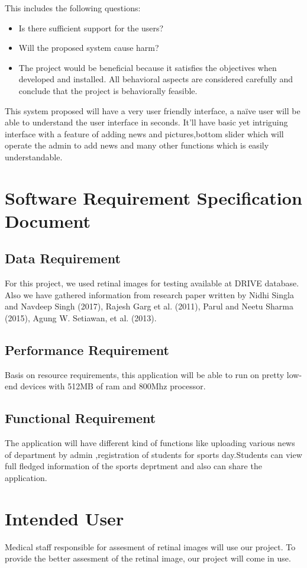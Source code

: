 This includes the following questions:
\begin{itemize}
	\item Is there sufficient support for the users?
	\item Will the proposed system cause harm?
	\item The project would be beneficial because it satisfies the objectives when developed and installed. All behavioral aspects are considered carefully and conclude that the project is behaviorally feasible.
\end{itemize}

This system proposed will have a very user friendly interface, a naïve user will be able to understand the user interface in seconds. It’ll have basic yet intriguing interface with a feature of adding news and pictures,bottom slider which will operate the admin to add news and many other functions which is easily understandable.

\section{Software Requirement Specification Document}
\subsection{Data Requirement}
For this project, we used retinal images for testing available at DRIVE database. Also we have gathered information from research paper written by Nidhi Singla and Navdeep Singh (2017), Rajesh Garg et al. (2011), Parul and Neetu Sharma (2015), Agung W. Setiawan, et al. (2013).    

\subsection{Performance Requirement}
Basis on resource requirements, this application will be able to run on pretty low-end devices with 512MB of ram and 800Mhz processor.

\subsection{Functional Requirement}
The application will have different kind of functions like uploading various news of department by admin ,registration of students for sports day.Students can view full fledged information of the sports deprtment and also can share the application.  

\section{Intended User}
Medical staff responsible for assesment of retinal images will use our project. To provide the better assesment of the retinal image, our project will come in use.  

